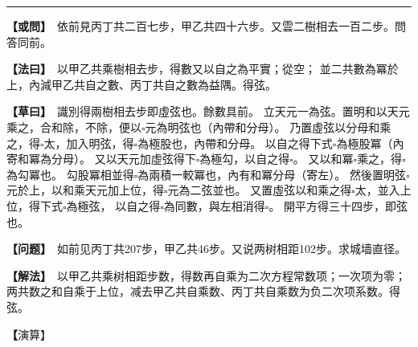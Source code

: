 \documentclass[11pt,a4paper]{article}
\let\origsquare\square
\renewcommand{\square}{\ensuremath{\origsquare}}%
\newcommand{\longline}{\noindent\rule{\textwidth}{0.4pt}}
\newcommand{\clOWEN}[1]{%
  \par\vspace{0.3em}%
  \noindent\textcolor{problemcolor}{\textbf{【或問】}}\,{\tradfont #1}\par\nopagebreak%
}
\newcommand{\mdOWEN}[1]{%
  \par\vspace{0.3em}%
  \noindent\textcolor{problemcolor}{\textbf{【问题】}}\,{\modfont #1}\par\nopagebreak%
}
\newcommand{\clFAYUE}[1]{%
  \par\noindent\textcolor{methodcolor}{\textbf{【法曰】}}\,{\tradfont #1}\par\nopagebreak%
}
\newcommand{\mdFAYUE}[1]{%
  \par\noindent\textcolor{methodcolor}{\textbf{【解法】}}\,{\modfont #1}\par\nopagebreak%
}
\newcommand{\clTSAOYUE}[1]{%
  \par\noindent\textcolor{workcolor}{\textbf{【草曰】}}\,{\tradfont #1}\par%
}
\newcommand{\mdTSAOYUE}[1]{%
  \par\noindent\textcolor{workcolor}{\textbf【演算】}}\,{\modfont #1}\par%
\begin{document}
\vspace{0.3cm}
\begin{center}\longline\end{center}

\begin{paracol}{2}

\begin{leftcolumn}
\clOWEN{%
依前見丙丁共二百七步，甲乙共四十六步。又雲二樹相去一百二步。問答同前。}

\clFAYUE{%
以甲乙共乘樹相去步，得數又以自之為平實；從空；
並二共數為冪於上，內減甲乙共自之數、丙丁共自之數為益隅。得弦。}

\clTSAOYUE{%
識別得兩樹相去步即虛弦也。餘數具前。
立天元一為弦。置明和以天元乘之，合和除，不除，便以$\square$元為明弦也（內帶和分母）。
乃置虛弦以分母和乘之，得$\square$太，加入明弦，得$\square$為極股也，內帶和分母。
以自之得下式$\square$為極股冪（內寄和冪為分母）。
又以天元加虛弦得下$\square$為極勾，以自之得$\square$。
又以和冪$\square$乘之，得$\square$為勾冪也。
勾股冪相並得$\square$為兩積一較冪也，內有和冪分母（寄左）。
然後置明弦$\square$元於上，以和乘天元加上位，得$\square$元為二弦並也。
又置虛弦以和乘之得$\square$太，並入上位，得下式$\square$為極弦，
以自之得$\square$為同數，與左相消得$\square$。
開平方得三十四步，即弦也。}
\end{leftcolumn}

\switchcolumn

\begin{rightcolumn}
\mdOWEN{%
如前见丙丁共207步，甲乙共46步。又说两树相距102步。求城墙直径。}

\mdFAYUE{%
以甲乙共乘树相距步数，得数再自乘为二次方程常数项；一次项为零；
两共数之和自乘于上位，减去甲乙共自乘数、丙丁共自乘数为负二次项系数。得弦。}

\mdTSAOYUE{%
辨识得：两树相距步数即虚弦。其余数如前。
设天元一为弦。取明和以天元乘之，应以和除，不除，便以$\square$元为明弦（内带和分母）。
取虚弦以分母和乘之，得$\square$太，加入明弦，得$\square$为极股，内带和分母。
自乘得下式$\square$为极股冪（内寄和冪为分母）。
又以天元加虚弦得下式$\square$为极勾，自乘得$\square$。
又以和冪$\square$乘之，得$\square$为勾冪。
勾股冪合并得$\square$为两积一较冪，内有和冪分母（寄左）。
然后取明弦$\square$元于上位，以和乘天元加上位，得$\square$元为两弦和。
再取虚弦以和乘之得$\square$太，合并入上位，得下式$\square$为极弦，
自乘得$\square$为同数，与左式相消得$\square$。
开平方得34步，即弦。}
\end{rightcolumn}

\end{paracol}
\end{document}
